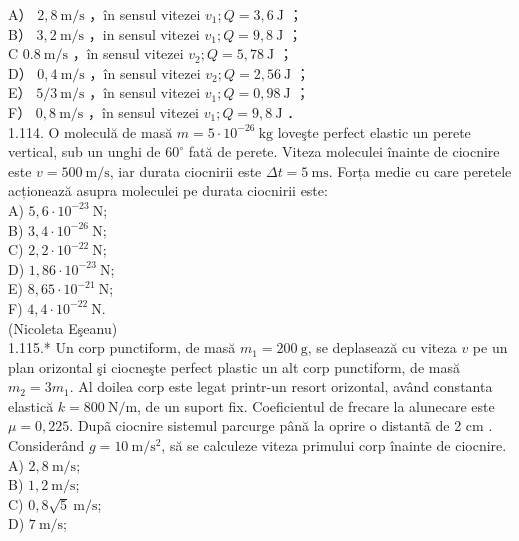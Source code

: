 \documentclass[10pt]{article}
\begin{document}
A） $2,8 \mathrm{~m} / \mathrm{s}$ ，în sensul vitezei $v_{1} ; Q=3,6 \mathrm{~J}$ ；\\
B） $3,2 \mathrm{~m} / \mathrm{s}$ ，in sensul vitezei $v_{1} ; Q=9,8 \mathrm{~J}$ ；\\
C $0.8 \mathrm{~m} / \mathrm{s}$ ，în sensul vitezei $v_{2} ; Q=5,78 \mathrm{~J}$ ；\\
D） $0,4 \mathrm{~m} / \mathrm{s}$ ，în sensul vitezei $v_{2} ; Q=2,56 \mathrm{~J}$ ；\\
E） $5 / 3 \mathrm{~m} / \mathrm{s}$ ，în sensul vitezei $v_{1} ; Q=0,98 \mathrm{~J}$ ；\\
F） $0,8 \mathrm{~m} / \mathrm{s}$ ，în sensul vitezei $v_{1} ; Q=9,8 \mathrm{~J}$ ．\\
1.114. O moleculă de masă $m=5 \cdot 10^{-26} \mathrm{~kg}$ loveşte perfect elastic un perete vertical, sub un unghi de $60^{\circ}$ fată de perete. Viteza moleculei înainte de ciocnire este $v=500 \mathrm{~m} / \mathrm{s}$, iar durata ciocnirii este $\Delta t=5 \mathrm{~ms}$. Forța medie cu care peretele acționează asupra moleculei pe durata ciocnirii este:\\
A) $5,6 \cdot 10^{-23} \mathrm{~N}$;\\
B) $3,4 \cdot 10^{-26} \mathrm{~N}$;\\
C) $2,2 \cdot 10^{-22} \mathrm{~N}$;\\
D) $1,86 \cdot 10^{-23} \mathrm{~N}$;\\
E) $8,65 \cdot 10^{-21} \mathrm{~N}$;\\
F) $4,4 \cdot 10^{-22} \mathrm{~N}$.\\
(Nicoleta Eşeanu)\\
1.115.* Un corp punctiform, de masă $m_{1}=200 \mathrm{~g}$, se deplasează cu viteza $v$ pe un plan orizontal şi ciocneşte perfect plastic un alt corp punctiform, de masă $m_{2}=3 m_{1}$. Al doilea corp este legat printr-un resort orizontal, având constanta elastică $k=800 \mathrm{~N} / \mathrm{m}$, de un suport fix. Coeficientul de frecare la alunecare este $\mu=0,225$. Dupã ciocnire sistemul parcurge până la oprire o distantã de 2 cm . Considerând $g=10 \mathrm{~m} / \mathrm{s}^{2}$, să se calculeze viteza primului corp înainte de ciocnire.\\
A) $2,8 \mathrm{~m} / \mathrm{s}$;\\
B) $1,2 \mathrm{~m} / \mathrm{s}$;\\
C) $0,8 \sqrt{5} \mathrm{~m} / \mathrm{s}$;\\
D) $7 \mathrm{~m} / \mathrm{s}$;\\
\end{document}
